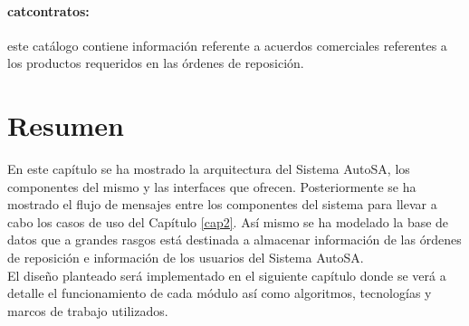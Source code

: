 \paragraph{cat{\textunderscore}contratos:} este catálogo contiene información referente a acuerdos comerciales referentes a los productos requeridos en las órdenes de reposición.


\section{Resumen}
En este capítulo se ha mostrado la arquitectura del Sistema AutoSA, los componentes del mismo y las interfaces que ofrecen. Posteriormente se ha mostrado el flujo de mensajes entre los componentes del sistema para llevar a cabo los casos de uso del Capítulo \ref{cap2}. Así mismo se ha modelado la base de datos que a grandes rasgos está destinada a almacenar información de las órdenes de reposición e información de los usuarios del Sistema AutoSA.\\
El diseño planteado será implementado en el siguiente capítulo donde se verá a detalle el funcionamiento de cada módulo así como algoritmos, tecnologías y marcos de trabajo utilizados. 